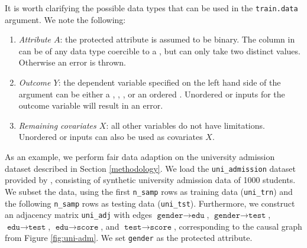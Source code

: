\documentclass[
  nojss]{jss}
\providecommand{\tightlist}{%
  \setlength{\itemsep}{0pt}\setlength{\parskip}{0pt}}
\begin{document}
It is worth clarifying the possible data types that can be used in the
\texttt{train.data} argument. We note the following:

\begin{enumerate}
\def\labelenumi{(\roman{enumi})}
\tightlist
\item
  \emph{Attribute \(A\)}: the protected attribute is assumed to be
  binary. The  column in  can be of any
  data type coercible to a , but can only take two distinct
  values. Otherwise an error is thrown.
\item
  \emph{Outcome \(Y\)}: the dependent variable specified on the left
  hand side of the  argument can be either a
  , , , or an ordered
  . Unordered  or  inputs for
  the outcome variable will result in an error.
\item
  \emph{Remaining covariates \(X\)}: all other variables do not have
  limitations. Unordered  or  inputs can
  also be used as covariates \(X\).
\end{enumerate}

As an example, we perform fair data adaption on the university admission
dataset described in Section \ref{methodology}. We load the
\texttt{uni\_admission} dataset provided by , consisting
of synthetic university admission data of 1000 students. We subset the
data, using the first \texttt{n\_samp} rows as training data
(\texttt{uni\_trn}) and the following \texttt{n\_samp} rows as testing
data (\texttt{uni\_tst}). Furthermore, we construct an adjacency matrix
\texttt{uni\_adj} with edges \(\texttt{gender} \to \texttt{edu}\),
\(\texttt{gender} \to \texttt{test}\),
\(\texttt{edu} \to \texttt{test}\), \(\texttt{edu} \to \texttt{score}\),
and \(\texttt{test} \to \texttt{score}\), corresponding to the causal
graph from Figure \ref{fig:uni-adm}. We set \texttt{gender} as the
protected attribute.
\end{document}
